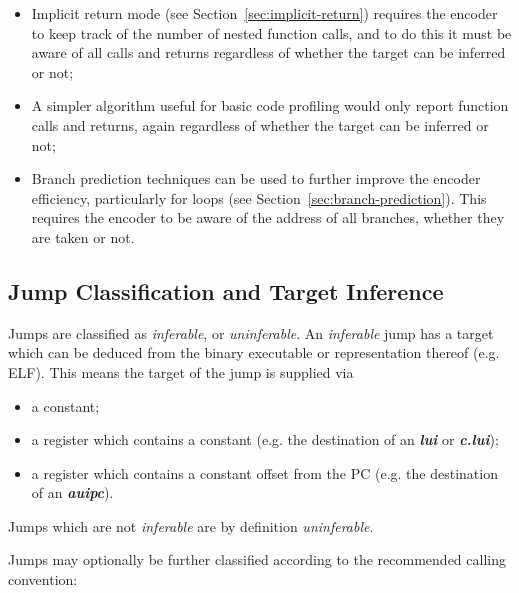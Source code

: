 \begin{itemize}
  \item Implicit return mode (see Section~\ref{sec:implicit-return}) requires the encoder to keep track of the number of nested 
    function calls, and to do this it must be aware of all calls and returns regardless of whether the target can be inferred or not;
  \item A simpler algorithm useful for basic code profiling would only report function calls and returns, again 
    regardless of whether the target can be inferred or not;
  \item Branch prediction techniques can be used to further improve the encoder efficiency, particularly for loops 
    (see Section~\ref{sec:branch-prediction}).  This requires the encoder to be aware of the address of all branches, whether
    they are taken or not.
\end{itemize}

\subsection {Jump Classification and Target Inference} \label{Jump Classes}

Jumps are classified as \textit{inferable}, or \textit{uninferable}.  An \textit{inferable} jump has a target which can be
deduced from the binary executable or representation thereof (e.g. ELF).  This means the target of the jump is supplied via

\begin{itemize}
  \item a constant;
  \item a register which contains a constant (e.g. the destination of an \textbf{\textit{lui}} or \textbf{\textit{c.lui}});
  \item a register which contains a constant offset from the PC (e.g. the destination of an \textbf{\textit{auipc}}).
\end{itemize}

Jumps which are not \textit{inferable} are by definition \textit{uninferable}.

Jumps may optionally be further classified according to the recommended calling convention:

